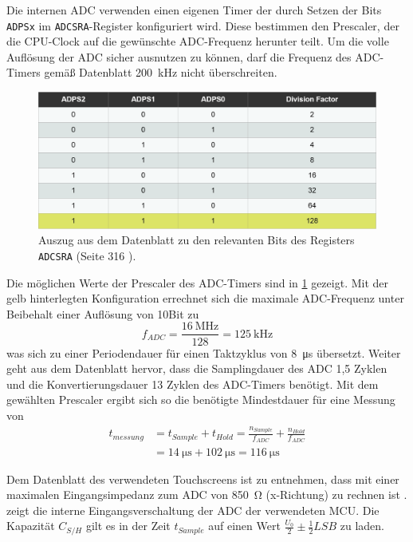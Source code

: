 		Die internen ADC verwenden einen eigenen Timer der durch Setzen der Bits \texttt{ADPSx} im \texttt{ADCSRA}-Register konfiguriert wird.
		Diese bestimmen den Prescaler, der die CPU-Clock auf die gewünschte ADC-Frequenz herunter teilt.
		Um die volle Auflösung der ADC sicher ausnutzen zu können, darf die Frequenz des ADC-Timers gemäß Datenblatt \SI{200}{\kilo\hertz} nicht überschreiten.
		\begin{figure}[ht]
			\centering
			\includegraphics[width=.9\textwidth]{fig/raster/ADC-Timer_Config.png}
			\caption[Auszug aus dem Datenblatt zu den relevanten Bits des Registers \texttt{ADCSRA}]{Auszug aus dem Datenblatt zu den relevanten Bits des Registers \texttt{ADCSRA} (Seite 316 \cite{MicrochipTechnologyInc.ATmega32U4.Datasheet.2016}).}
			\label{fig:adc timer konfig}
		\end{figure}
		Die möglichen Werte der Prescaler des ADC-Timers sind in \cref{fig:adc timer konfig} gezeigt.
		Mit der gelb hinterlegten Konfiguration errechnet sich die maximale ADC-Frequenz unter Beibehalt einer Auflösung von 10Bit zu
		\begin{equation}
			f_{ADC} = \frac{\SI{16}{\mega\hertz}}{128} = \SI{125}{\kilo\hertz}
			\label{eq:adc timer}
		\end{equation}
		was sich zu einer Periodendauer für einen Taktzyklus von \SI{8}{\micro\second} übersetzt.
		Weiter geht aus dem Datenblatt hervor, dass die Samplingdauer des ADC 1,5 Zyklen und die Konvertierungsdauer 13 Zyklen des ADC-Timers benötigt.
		Mit dem gewählten Prescaler ergibt sich so die benötigte Mindestdauer für eine Messung von
		\begin{align}
			t_{messung} &= t_{Sample} + t_{Hold} = \frac{n_{Sample}}{f_{ADC}} + \frac{n_{Hold}}{f_{ADC}} \nonumber \\
						&= \SI{14}{\micro\second} + \SI{102}{\micro\second} = \SI{116}{\micro\second}
			\label{eq:adc messdauer}
		\end{align}

		Dem Datenblatt des verwendeten Touchscreens ist zu entnehmen, dass mit einer maximalen Eingangsimpedanz zum ADC von \SI{850}{\ohm} (x-Richtung) zu rechnen ist \cite{FUJITSU.touchscreen.datasheet}.
		 zeigt die interne Eingangsverschaltung der ADC der verwendeten MCU. Die Kapazität \(C_{S/H}\) gilt es in der Zeit \(t_{Sample}\) auf einen Wert \(\frac{U_0}{2} \pm \frac{1}{2}LSB\) zu laden.

